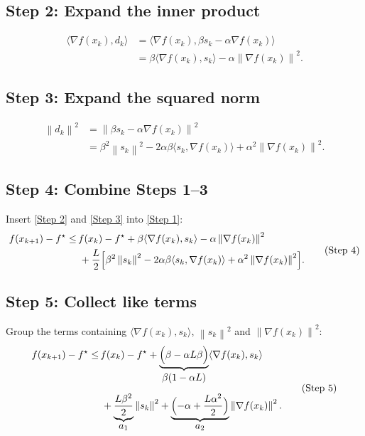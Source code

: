 \documentclass[11pt]{article}
\newcommand{\norm}[1]{\left\lVert#1\right\rVert}
\begin{document}
\subsection*{Step 2: Expand the inner product}
\[
\begin{aligned}
\langle\nabla f(x_{k}),d_{k}\rangle
&= \langle\nabla f(x_{k}),\beta s_{k}-\alpha\nabla f(x_{k})\rangle\\
&= \beta\langle\nabla f(x_{k}),s_{k}\rangle
   -\alpha\norm{\nabla f(x_{k})}^{2}. \tag{Step 2}
\end{aligned}
\]

\subsection*{Step 3: Expand the squared norm}
\[
\begin{aligned}
\norm{d_{k}}^{2}
&= \norm{\beta s_{k}-\alpha\nabla f(x_{k})}^{2}\\
&= \beta^{2}\norm{s_{k}}^{2}
   -2\alpha\beta\langle s_{k},\nabla f(x_{k})\rangle
   +\alpha^{2}\norm{\nabla f(x_{k})}^{2}. \tag{Step 3}
\end{aligned}
\]

\subsection*{Step 4: Combine Steps 1–3}
Insert \eqref{Step 2} and \eqref{Step 3} into \eqref{Step 1}:
\[
\begin{aligned}
f(x_{k+1})-f^{\star}
\le &\, f(x_{k})-f^{\star}
   +\beta\langle\nabla f(x_{k}),s_{k}\rangle
   -\alpha\norm{\nabla f(x_{k})}^{2}\\
   &\;+\frac{L}{2}\Bigl[\beta^{2}\norm{s_{k}}^{2}
   -2\alpha\beta\langle s_{k},\nabla f(x_{k})\rangle
   +\alpha^{2}\norm{\nabla f(x_{k})}^{2}\Bigr].
\end{aligned}
\tag{Step 4}
\]

\subsection*{Step 5: Collect like terms}
Group the terms containing $\langle\nabla f(x_{k}),s_{k}\rangle$, $\norm{s_{k}}^{2}$ and $\norm{\nabla f(x_{k})}^{2}$:
\[
\begin{aligned}
f(x_{k+1})-f^{\star}
\le &\, f(x_{k})-f^{\star}
   +\underbrace{\Bigl(\beta-\alpha L\beta\Bigr)}_{\displaystyle\beta(1-\alpha L)}
      \langle\nabla f(x_{k}),s_{k}\rangle\\[2mm]
   &\;+\underbrace{\frac{L\beta^{2}}{2}}_{\displaystyle a_{1}}
      \norm{s_{k}}^{2}
   +\underbrace{\Bigl(-\alpha+\frac{L\alpha^{2}}{2}\Bigr)}_{\displaystyle a_{2}}
      \norm{\nabla f(x_{k})}^{2}.
\end{aligned}
\tag{Step 5}
\]
\end{document}
